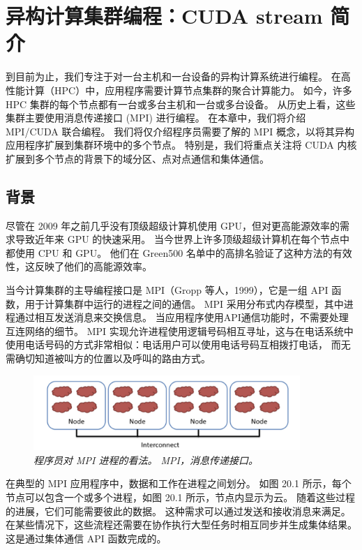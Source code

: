 \section{异构计算集群编程：CUDA stream 简介}
到目前为止，我们专注于对一台主机和一台设备的异构计算系统进行编程。 
在高性能计算（HPC）中，应用程序需要计算节点集群的聚合计算能力。 
如今，许多 HPC 集群的每个节点都有一台或多台主机和一台或多台设备。 
从历史上看，这些集群主要使用消息传递接口 (MPI) 进行编程。 在本章中，我们将介绍 MPI/CUDA 联合编程。 
我们将仅介绍程序员需要了解的 MPI 概念，以将其异构应用程序扩展到集群环境中的多个节点。 
特别是，我们将重点关注将 CUDA 内核扩展到多个节点的背景下的域分区、点对点通信和集体通信。

\subsection{背景}
尽管在 2009 年之前几乎没有顶级超级计算机使用 GPU，但对更高能源效率的需求导致近年来 GPU 的快速采用。 
当今世界上许多顶级超级计算机在每个节点中都使用 CPU 和 GPU。 
他们在 Green500 名单中的高排名验证了这种方法的有效性，这反映了他们的高能源效率。

当今计算集群的主导编程接口是 MPI（Gropp 等人，1999），它是一组 API 函数，用于计算集群中运行的进程之间的通信。 
MPI 采用分布式内存模型，其中进程通过相互发送消息来交换信息。 当应用程序使用API通信功能时，不需要处理互连网络的细节。 
MPI 实现允许进程使用逻辑号码相互寻址，这与在电话系统中使用电话号码的方式非常相似：电话用户可以使用电话号码互相拨打电话，
而无需确切知道被叫方的位置以及呼叫的路由方式。

\begin{figure}[H]
	\centering
	\includegraphics[width=0.9\textwidth]{figs/F20.1.png}
	\caption{\textit{程序员对 MPI 进程的看法。 MPI，消息传递接口。}}
\end{figure}

在典型的 MPI 应用程序中，数据和工作在进程之间划分。 
如图 20.1 所示，每个节点可以包含一个或多个进程，如图 20.1 所示，节点内显示为云。 
随着这些过程的进展，它们可能需要彼此的数据。 这种需求可以通过发送和接收消息来满足。 
在某些情况下，这些流程还需要在协作执行大型任务时相互同步并生成集体结果。 这是通过集体通信 API 函数完成的。

